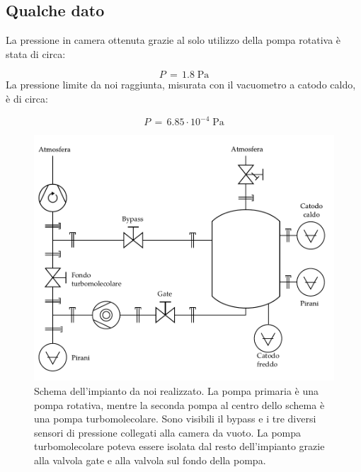 \subsection{Qualche dato}

La pressione in camera ottenuta grazie al solo utilizzo della pompa rotativa è stata di circa:

\begin{equation}
    P \,=\, 1.8  \; \si{\pascal}
\end{equation}
%
La pressione limite da noi raggiunta, misurata con il vacuometro a catodo caldo, è di circa:

\begin{equation}
    P \,=\, 6.85 \cdot 10^{-4} \; \si{\pascal}
\end{equation}

\begin{figure}[b!]
    \centering
   \includegraphics[width=16cm]{drawing.pdf}
   \caption{Schema dell'impianto da noi realizzato. La pompa primaria è una pompa rotativa, mentre la seconda pompa al centro dello schema
   è una pompa turbomolecolare. Sono visibili il bypass e i tre diversi sensori di pressione collegati alla camera da vuoto. La pompa
   turbomolecolare poteva essere isolata dal resto dell'impianto grazie alla valvola gate e alla valvola sul fondo della pompa.}
   \label{fig:schema}
\end{figure}